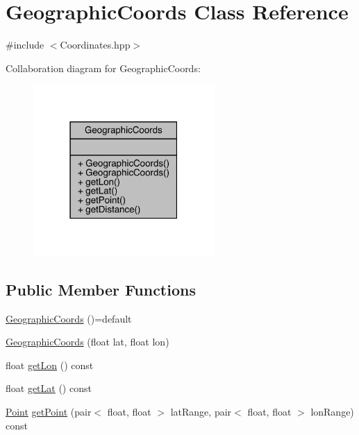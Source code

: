 \hypertarget{class_geographic_coords}{}\section{Geographic\+Coords Class Reference}
\label{class_geographic_coords}


{\ttfamily \#include $<$Coordinates.\+hpp$>$}



Collaboration diagram for Geographic\+Coords\+:
\nopagebreak
\begin{figure}[H]
\begin{center}
\leavevmode
\includegraphics[width=195pt]{class_geographic_coords__coll__graph}
\end{center}
\end{figure}
\subsection*{Public Member Functions}
\begin{DoxyCompactItemize}
\item 
\hyperlink{class_geographic_coords_a6e58da78d507551dc7a6c39e6ffb33b3}{Geographic\+Coords} ()=default
\item 
\hyperlink{class_geographic_coords_a5db8168e8754a1eb2d13e3d2c8318cb4}{Geographic\+Coords} (float lat, float lon)
\item 
float \hyperlink{class_geographic_coords_a4e59f2e3ea261e73c33014368770ad21}{get\+Lon} () const
\item 
float \hyperlink{class_geographic_coords_ab2fa1d7cde50be2a00c297caa302297a}{get\+Lat} () const
\item 
\hyperlink{class_point}{Point} \hyperlink{class_geographic_coords_aa333be28efcee6d8da24adabe5cd5594}{get\+Point} (pair$<$ float, float $>$ lat\+Range, pair$<$ float, float $>$ lon\+Range) const
\end{DoxyCompactItemize}
